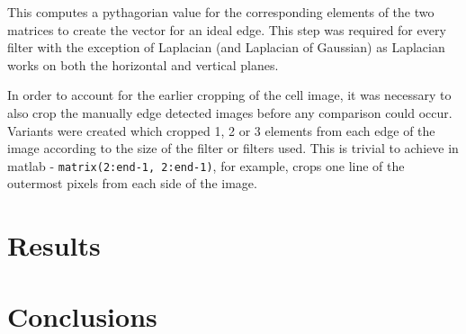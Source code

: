 \documentclass[12pt]{article}
\begin{document}
  This computes a pythagorian value for the corresponding elements of the two matrices to create the vector for an ideal edge. This step was required for every filter with the exception of Laplacian (and Laplacian of Gaussian) as Laplacian works on both the horizontal and vertical planes.

  In order to account for the earlier cropping of the cell image, it was necessary to also crop the manually edge detected images before any comparison could occur. Variants were created which cropped 1, 2 or 3 elements from each edge of the image according to the size of the filter or filters used. This is trivial to achieve in matlab - \texttt{matrix(2:end-1, 2:end-1)}, for example, crops one line of the outermost pixels from each side of the image.

  \section{Results}

  \section{Conclusions}
\end{document}
